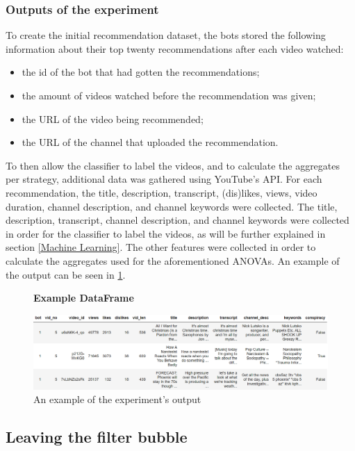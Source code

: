 \documentclass[../main.tex]{subfiles}
\begin{document}
\subsubsection{Outputs of the experiment}
To create the initial recommendation dataset, the bots stored the following information about their top 
twenty recommendations after each video watched: 
\begin{itemize}
    \item the id of the bot that had gotten the recommendations;
    \item the amount of videos watched before the recommendation was given;
    \item the URL of the video being recommended;
    \item the URL of the channel that uploaded the recommendation.
\end{itemize}
To then allow the classifier to label the videos, and to calculate the aggregates per strategy, additional 
data was gathered using YouTube's API. For each recommendation, the title, description, transcript, 
(dis)likes, views, video duration, channel description, and channel keywords were collected. The title, 
description, transcript, channel description, and channel keywords were collected in order for the 
classifier to label the videos, as will be further explained in section \ref{Machine Learning}. The other 
features were collected in order to calculate the aggregates used for the aforementioned ANOVAs. An example of the output can be seen in \ref{fig:DF_example}.

\begin{figure}[t]
  \textbf{Example DataFrame}\par\medskip
  \centering
  \includegraphics[keepaspectratio, width=\textwidth]{images/df_example.png}
  \caption{An example of the experiment's output}
  \label{fig:DF_example}
\end{figure}

\subsection{Leaving the filter bubble}
\end{document}
